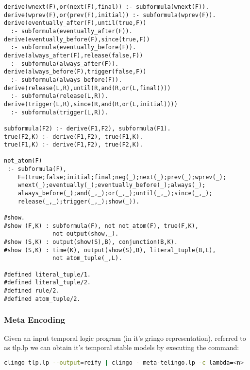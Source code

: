 \begin{center}
\begin{minipage}{\linewidth}
  \begin{lstlisting}[language=clingo, label={lst:meta-telingo2}]
derive(wnext(F),or(next(F),final)) :- subformula(wnext(F)).
derive(wprev(F),or(prev(F),initial)) :- subformula(wprev(F)).
derive(eventually_after(F),until(true,F)) 
  :- subformula(eventually_after(F)).
derive(eventually_before(F),since(true,F)) 
  :- subformula(eventually_before(F)).
derive(always_after(F),release(false,F)) 
  :- subformula(always_after(F)).
derive(always_before(F),trigger(false,F)) 
  :- subformula(always_before(F)).
derive(release(L,R),until(R,and(R,or(L,final)))) 
  :- subformula(release(L,R)).
derive(trigger(L,R),since(R,and(R,or(L,initial)))) 
  :- subformula(trigger(L,R)).

subformula(F2) :- derive(F1,F2), subformula(F1).
true(F2,K) :- derive(F1,F2), true(F1,K).
true(F1,K) :- derive(F1,F2), true(F2,K).

not_atom(F) 
 :- subformula(F), 
    F=(true;false;initial;final;neg(_);next(_);prev(_);wprev(_);
    wnext(_);eventually(_);eventually_before(_);always(_);
    always_before(_);and(_,_);or(_,_);until(_,_);since(_,_);
    release(_,_);trigger(_,_);show(_)).

#show.
#show (F,K) : subformula(F), not not_atom(F), true(F,K), 
              not output(show,_).
#show (S,K) : output(show(S),B), conjunction(B,K).
#show (S,K) : time(K), output(show(S),B), literal_tuple(B,L), 
              not atom_tuple(_,L).

#defined literal_tuple/1.
#defined literal_tuple/2.
#defined rule/2.
#defined atom_tuple/2.
\end{lstlisting}
\end{minipage}
\end{center}

\subsubsection{Meta Encoding}

Given an input temporal logic program (in it's gringo representation),
referred to as tlp.lp we can obtain it's temporal stable models by
executing the command:

\begin{lstlisting}[language=bash,numbers=none]
clingo tlp.lp --output=reify | clingo - meta-telingo.lp -c lambda=<n>
\end{lstlisting}

